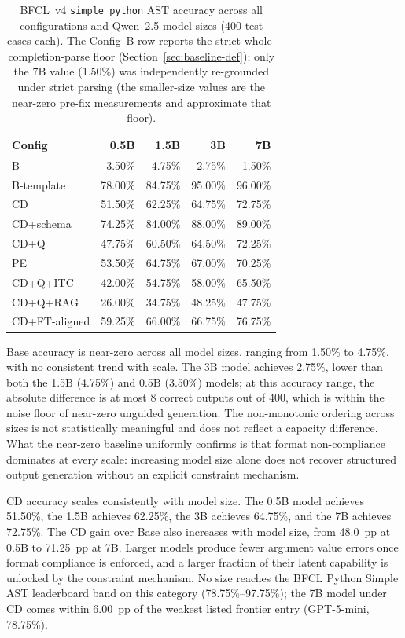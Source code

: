 \begin{table}[ht]
\centering
\caption{BFCL~v4 \texttt{simple\_python} AST accuracy across all configurations
and Qwen~2.5 model sizes (400 test cases each). The Config~B row reports the
strict whole-completion-parse floor (Section~\ref{sec:baseline-def}); only the
7B value (1.50\%) was independently re-grounded under strict parsing (the
smaller-size values are the near-zero pre-fix measurements and approximate that
floor).}
\label{tab:size-sweep-full}
\begin{tabular}{lrrrr}
\toprule
Config        & 0.5B    & 1.5B    & 3B      & 7B      \\
\midrule
B             & 3.50\%  & 4.75\%  & 2.75\%  & 1.50\%  \\
B-template    & 78.00\% & 84.75\% & 95.00\% & 96.00\% \\
CD            & 51.50\% & 62.25\% & 64.75\% & 72.75\% \\
CD+schema     & 74.25\% & 84.00\% & 88.00\% & 89.00\% \\
CD+Q          & 47.75\% & 60.50\% & 64.50\% & 72.25\% \\
PE            & 53.50\% & 64.75\% & 67.00\% & 70.25\% \\
CD+Q+ITC      & 42.00\% & 54.75\% & 58.00\% & 65.50\% \\
CD+Q+RAG      & 26.00\% & 34.75\% & 48.25\% & 47.75\% \\
CD+FT-aligned & 59.25\% & 66.00\% & 66.75\% & 76.75\% \\
\bottomrule
\end{tabular}
\end{table}

Base accuracy is near-zero across all model sizes, ranging from 1.50\%
to 4.75\%, with no consistent trend with scale. The 3B model achieves 2.75\%,
lower than both the 1.5B (4.75\%) and 0.5B (3.50\%) models; at this accuracy
range, the absolute difference is at most 8 correct outputs out of 400, which
is within the noise floor of near-zero unguided generation. The non-monotonic
ordering across sizes is not statistically meaningful and does not reflect a
capacity difference. What the near-zero baseline uniformly confirms is that
format non-compliance dominates at every scale: increasing model size alone
does not recover structured output generation without an explicit constraint
mechanism.

CD accuracy scales consistently with model size. The 0.5B model achieves
51.50\%, the 1.5B achieves 62.25\%, the 3B achieves 64.75\%, and the 7B
achieves 72.75\%. The CD gain over Base also increases with model size, from
48.0~pp at 0.5B to 71.25~pp at 7B. Larger models produce fewer argument value
errors once format compliance is enforced, and a larger fraction of their
latent capability is unlocked by the constraint mechanism. No size reaches
the BFCL Python Simple AST leaderboard band on this category
(78.75\%--97.75\%); the 7B model under CD comes within 6.00~pp of the
weakest listed frontier entry (GPT-5-mini, 78.75\%).

